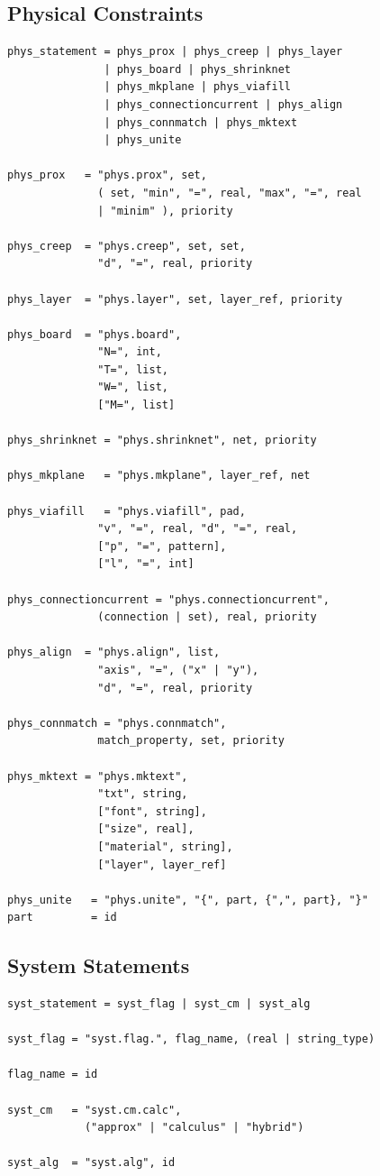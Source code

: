 \subsection{Physical Constraints}
\begin{verbatim}
phys_statement = phys_prox | phys_creep | phys_layer
               | phys_board | phys_shrinknet
               | phys_mkplane | phys_viafill
               | phys_connectioncurrent | phys_align
               | phys_connmatch | phys_mktext
               | phys_unite

phys_prox   = "phys.prox", set,
              ( set, "min", "=", real, "max", "=", real
              | "minim" ), priority

phys_creep  = "phys.creep", set, set,
              "d", "=", real, priority

phys_layer  = "phys.layer", set, layer_ref, priority

phys_board  = "phys.board",
              "N=", int,
              "T=", list,
              "W=", list,
              ["M=", list]

phys_shrinknet = "phys.shrinknet", net, priority

phys_mkplane   = "phys.mkplane", layer_ref, net

phys_viafill   = "phys.viafill", pad,
              "v", "=", real, "d", "=", real,
              ["p", "=", pattern],
              ["l", "=", int]

phys_connectioncurrent = "phys.connectioncurrent",
              (connection | set), real, priority

phys_align  = "phys.align", list,
              "axis", "=", ("x" | "y"),
              "d", "=", real, priority

phys_connmatch = "phys.connmatch",
              match_property, set, priority

phys_mktext = "phys.mktext",
              "txt", string,
              ["font", string],
              ["size", real],
              ["material", string],
              ["layer", layer_ref]

phys_unite   = "phys.unite", "{", part, {",", part}, "}"
part         = id
\end{verbatim}

\subsection{System Statements}
\begin{verbatim}
syst_statement = syst_flag | syst_cm | syst_alg

syst_flag = "syst.flag.", flag_name, (real | string_type)

flag_name = id

syst_cm   = "syst.cm.calc",
            ("approx" | "calculus" | "hybrid")

syst_alg  = "syst.alg", id
\end{verbatim}

